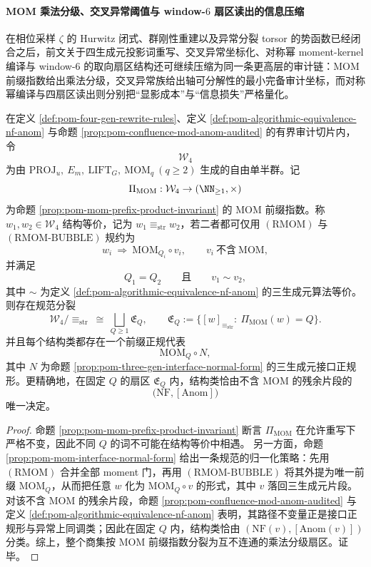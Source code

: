 \paragraph{MOM 乘法分级、交叉异常阈值与 window-\texorpdfstring{$6$}{6} 扇区读出的信息压缩}
在相位采样 \(\zeta\) 的 Hurwitz 闭式、群刚性重建以及异常分裂 torsor 的势函数已经闭合之后，前文关于四生成元投影词重写、交叉异常坐标化、对称幂 moment-kernel 编译与 window-\(6\) 的取向扇区结构还可继续压缩为同一条更高层的审计链：MOM 前缀指数给出乘法分级，交叉异常族给出轴可分解性的最小完备审计坐标，而对称幂编译与四扇区读出则分别把“显影成本”与“信息损失”严格量化。

\begin{theorem}[四生成元投影词演算的乘法分级分裂]\label{thm:xi-time-part79-pom-multiplicative-graded-splitting}
在定义 \ref{def:pom-four-gen-rewrite-rules}、定义 \ref{def:pom-algorithmic-equivalence-nf-anom} 与命题 \ref{prop:pom-confluence-mod-anom-audited} 的有界审计切片内，令
\[
\mathcal W_4
\]
为由
\(
\mathrm{PROJ}_u,\ E_m,\ \mathrm{LIFT}_G,\ \mathrm{MOM}_q\ (q\ge 2)
\)
生成的自由单半群。记
\[
\Pi_{\mathrm{MOM}}:\mathcal W_4\to (\NN_{\ge 1},\times)
\]
为命题 \ref{prop:pom-mom-prefix-product-invariant} 的 MOM 前缀指数。称 \(w_1,w_2\in\mathcal W_4\) 结构等价，记为
\(
w_1\equiv_{\mathrm{str}}w_2
\)，若二者都可仅用 \((\mathrm{RMOM})\) 与 \((\mathrm{RMOM\text{-}BUBBLE})\) 规约为
\[
w_i\ \Rightarrow\ \mathrm{MOM}_{Q_i}\circ v_i,
\qquad
v_i\ \text{不含}\ \mathrm{MOM},
\]
并满足
\[
Q_1=Q_2
\qquad\text{且}\qquad
v_1\sim v_2,
\]
其中 \(\sim\) 为定义 \ref{def:pom-algorithmic-equivalence-nf-anom} 的三生成元算法等价。
则存在规范分裂
\[
\mathcal W_4/\equiv_{\mathrm{str}}
\ \cong\
\bigsqcup_{Q\ge 1}\mathfrak E_Q,
\qquad
\mathfrak E_Q:=
\{[w]_{\equiv_{\mathrm{str}}}:\ \Pi_{\mathrm{MOM}}(w)=Q\}.
\]
并且每个结构类都存在一个前缀正规代表
\[
\mathrm{MOM}_{Q}\circ N,
\]
其中 \(N\) 为命题 \ref{prop:pom-three-gen-interface-normal-form} 的三生成元接口正规形。更精确地，在固定 \(Q\) 的扇区 \(\mathfrak E_Q\) 内，结构类恰由不含 MOM 的残余片段的
\[
\bigl(\mathrm{NF},[\mathrm{Anom}]\bigr)
\]
唯一决定。
\end{theorem}
\begin{proof}
命题 \ref{prop:pom-mom-prefix-product-invariant} 断言 \(\Pi_{\mathrm{MOM}}\) 在允许重写下严格不变，因此不同 \(Q\) 的词不可能在结构等价中相遇。
另一方面，命题 \ref{prop:pom-mom-interface-normal-form} 给出一条规范的归一化策略：先用 \((\mathrm{RMOM})\) 合并全部 moment 门，再用 \((\mathrm{RMOM\text{-}BUBBLE})\) 将其外提为唯一前缀 \(\mathrm{MOM}_Q\)，从而把任意 \(w\) 化为 \(\mathrm{MOM}_Q\circ v\) 的形式，其中 \(v\) 落回三生成元片段。
对该不含 MOM 的残余片段，命题 \ref{prop:pom-confluence-mod-anom-audited} 与定义 \ref{def:pom-algorithmic-equivalence-nf-anom} 表明，其路径不变量正是接口正规形与异常上同调类；因此在固定 \(Q\) 内，结构类恰由 \((\mathrm{NF}(v),[\mathrm{Anom}(v)])\) 分类。综上，整个商集按 MOM 前缀指数分裂为互不连通的乘法分级扇区。证毕。
\end{proof}

